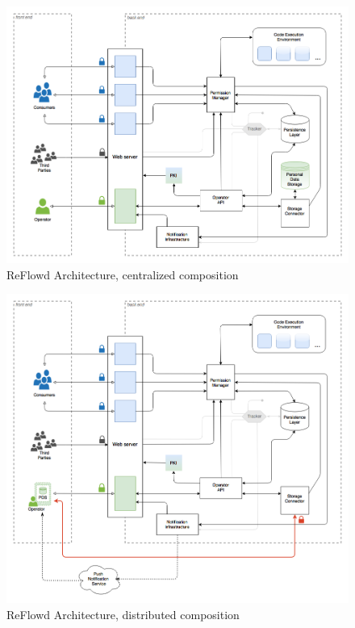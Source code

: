 \documentclass[12pt,english,a4paper,titlepage,cleardoublepage=empty,dottedtoc]{report}
\begin{document}
\begin{figure}
\centering
\includegraphics{./assets/figures/reflowd_component-composition_centralized.png}
\caption{ReFlowd Architecture, centralized
composition\label{fig:composition-centralized}}
\end{figure}

\begin{figure}
\centering
\includegraphics{./assets/figures/reflowd_component-composition_distributed.png}
\caption{ReFlowd Architecture, distributed
composition\label{fig:composition-distributed}}
\end{figure}
\end{document}
